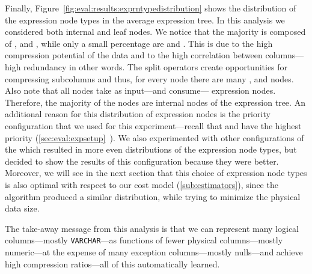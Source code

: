 
Finally, Figure~\ref{fig:eval:results:exprntypedistribution} shows the distribution of the expression node types in the average expression tree. In this analysis we considered both internal and leaf nodes. We notice that the majority is composed of ,  and , while only a small percentage are  and . This is due to the high  compression potential of the data and to the high correlation between columns---high redundancy in other words. The split operators create opportunities for compressing subcolumns and thus, for every  node there are many ,  and  nodes. Also note that all  nodes take as input---and consume--- expression nodes. Therefore, the majority of the  nodes are internal nodes of the expression tree. An additional reason for this distribution of expression nodes is the priority configuration that we used for this experiment---recall that  and  have the highest priority (\ref{sec:eval:expsetup}~). We also experimented with other configurations of the  which resulted in more even distributions of the expression node types, but decided to show the results of this configuration because they were better. Moreover, we will see in the next section that this choice of expression node types is also optimal with respect to our cost model (\ref{sub:estimators}), since the  algorithm produced a similar distribution, while trying to minimize the physical data size.


The take-away message from this analysis is that we can represent many logical columns---mostly \verb|VARCHAR|---as functions of fewer physical columns---mostly numeric---at the expense of many exception columns---mostly nulls---and achieve high compression ratios---all of this automatically learned.


